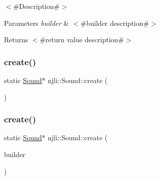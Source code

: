 $<$\#\+Description\#$>$


\begin{DoxyParams}{Parameters}
{\em builder} & $<$\#builder description\#$>$\\
\hline
\end{DoxyParams}
\begin{DoxyReturn}{Returns}
$<$\#return value description\#$>$ 
\end{DoxyReturn}
\mbox{\label{classnjli_1_1_sound_a1e4eecd523bbdeb14ad7960be052ece9}} 
\subsubsection{\texorpdfstring{create()}{create()}\hspace{0.1cm}{\footnotesize\ttfamily [2/3]}}
{\footnotesize\ttfamily static \mbox{\hyperlink{classnjli_1_1_sound}{Sound}}$\ast$ njli\+::\+Sound\+::create (\begin{DoxyParamCaption}{ }\end{DoxyParamCaption})\hspace{0.3cm}{\ttfamily [static]}}

\mbox{\label{classnjli_1_1_sound_a0541df0bea26b9f9f17d73b996d23aa6}} 
\subsubsection{\texorpdfstring{create()}{create()}\hspace{0.1cm}{\footnotesize\ttfamily [3/3]}}
{\footnotesize\ttfamily static \mbox{\hyperlink{classnjli_1_1_sound}{Sound}}$\ast$ njli\+::\+Sound\+::create (\begin{DoxyParamCaption}\item[{const \mbox{\hyperlink{classnjli_1_1_sound_builder}{Sound\+Builder}} \&}]{builder }\end{DoxyParamCaption})\hspace{0.3cm}{\ttfamily [static]}}

\mbox{\label{classnjli_1_1_sound_afe9d314ce74f806284a71dc06b4ed49a}} 
